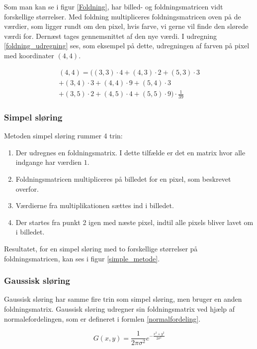 {Som man kan se i figur \ref{Foldning}, har billed- og foldningsmatricen
vidt forskellige størrelser. Med foldning multipliceres
foldningsmatricen oven på de værdier, som ligger rundt om den pixel,
hvis farve, vi gerne vil finde den slørede værdi for. Dernæst tages
gennemsnittet af den nye værdi. I udregning \eqref{foldning_udregning}
ses, som eksempel på dette, udregningen af farven på pixel med
koordinater $(4,4)$.

\begin{multline}
    (4,4) = ((3,3)\cdot 4+(4,3) \cdot 2+(5,3) \cdot 3\\
    + (3,4) \cdot 3+(4,4) \cdot 9+(5,4) \cdot 3\\
    + (3,5) \cdot 2+(4,5) \cdot 4+(5,5) \cdot 9) \cdot \frac{1}{39}
    \label{foldning_udregning}
\end{multline}

\subsubsection{Simpel sløring}
Metoden simpel sløring rummer 4 trin:
\begin{enumerate}
    \item Der udregnes en foldningsmatrix. I dette tilfælde er det en
        matrix hvor alle indgange har værdien $1$.
	\item Foldningsmatricen multipliceres på billedet for en pixel, som
        beskrevet overfor.
	\item Værdierne fra multiplikationen sættes ind i billedet.
	\item Der startes fra punkt 2 igen med næste pixel, indtil alle pixels
        bliver lavet om i billedet.
\end{enumerate}
Resultatet, for en simpel sløring med to forskellige størrelser på
foldningsmatricen, kan ses i figur \ref{simple_metode}.

\subsubsection{Gaussisk sløring}
Gaussisk sløring har samme fire trin som simpel sløring, men bruger en
anden foldningsmatrix. Gaussisk sløring udregner sin foldningsmatrix
ved hjælp af normalefordelingen, som er defineret i formlen
\ref{normalfordeling}.

\begin{equation}
	G(x,y) = \frac{1}{2\pi\sigma^2}e^{-\frac{x^2+y^2}{2\sigma^2}}
	\label{normalfordeling}
\end{equation}

}
